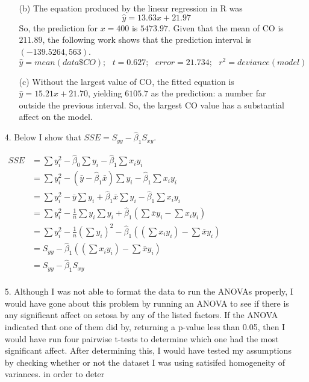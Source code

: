 \documentclass[12pt]{article}
\begin{document}
\begin{enumerate}
\begin{enumerate}
			\item[(b)] The equation produced by the linear regression in R was 
$$\hat{y} = 13.63x + 21.97 $$ So, the prediction for
 $x=400$ is $5473.97$. Given that the mean of CO is $211.89$, the following work shows 
		that the prediction interval is $(-139.5264, 563)$.
			$$\hat{y} = mean(data\$CO);\text{ }t = 0.627;\text{ } error = 21.734;\text{ }r^2 = deviance(model)$$
			\item[(c)] Without the largest value of CO, the fitted equation is $\hat{y} = 15.21x + 21.70$, 
			yielding $6105.7$ as the prediction: a number far outside the previous interval. So, 
			the largest CO value has a substantial affect on the model.
		\end{enumerate}
	\item[4.] Below I show that $SSE = S_{yy} - \hat{\beta}_1S_{xy}$.
		\begin{center}
		\begin{math}
		\begin{aligned}
			SSE &= \sum{y^2_i} - \hat{\beta}_0\sum{y_i} - \hat{\beta}_1\sum{x_iy_i}\\
			&= \sum{y^2_i} - (\bar{y} - \hat{\beta}_1\bar{x})\sum{y_i} - \hat{\beta}_1\sum{x_iy_i}\\
			&= \sum{y^2_i} -\bar{y}\sum{y_i} + \hat{\beta}_1\bar{x}\sum{y_i} - \hat{\beta}_1\sum{x_iy_i}\\
			&= \sum{y^2_i} -\frac{1}{n}\sum{y_i}\sum{y_i} + \hat{\beta}_1(\sum\bar{x}{y_i} - \sum{x_iy_i})\\
			&= \sum{y^2_i} -\frac{1}{n}(\sum{y_i})^2 - \hat{\beta}_1((\sum{x_iy_i}) - \sum{\bar{x}y_i})\\
			&= S_{yy} - \hat{\beta}_1((\sum{x_iy_i}) - \sum{\bar{x}y_i})\\
			&= S_{yy} - \hat{\beta}_1S_{xy}\\
		\end{aligned}
		\end{math}
		\end{center}
	\item[5.] Although I was not able to format the data to run the ANOVAs properly, I would have gone about this 
		problem by running an ANOVA to see if there is any significant affect on setosa by any of the listed factors.
		If the ANOVA indicated that one of them did by, returning a p-value less than 0.05, then I would have run four pairwise t-tests to determine which one had the most significant affect. After determining this, I would have tested my assumptions by checking whether or not the dataset I was using satisifed homogeneity of variances. 
		in order to deter
\end{enumerate}
\end{document}

